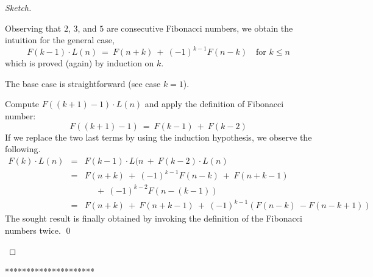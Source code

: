 {\begin{proof}[Sketch]
\begin{itemize}
Observing that $2$, $3$, and $5$ are consecutive Fibonacci numbers, we obtain the intuition for the general case,
\[  F(k-1) \cdot L(n) \ = \ F(n+k) \ + \ (-1)^{k-1}F(n-k) \ \ \ \mbox{ for  } k \leq n \]
which is proved (again) by induction on $k$.

\smallskip

The base case is straightforward (see case $k=1$).

\smallskip

Compute $F((k+1)-1) \cdot L(n)$ and apply the definition of Fibonacci number:
\[ F((k+1)-1) \ = \ F(k-1) \ + \ F(k-2) \]
If we replace the two last terms by using the induction hypothesis, we observe the following.
\begin{eqnarray*}
F(k) \cdot L(n) & = & F(k-1) \cdot L(n \ + \ F(k-2) \cdot L(n) \\
                        & = & F(n+k) \ + \ (-1)^{k-1} F(n-k) \ + \ F(n+k-1) \\
                        &    & \ \ \ \ \ \ + \ (-1)^{k-2} F(n-(k-1)) \\
                        & = & F(n+k) \ + \ F(n+k-1) \ + \ (-1)^{k-1} (F(n-k) \ -  F(n-k+1))
\end{eqnarray*}
The sought result is finally obtained by invoking the definition of the Fibonacci numbers twice. \qed
\end{itemize}
\end{proof}
*********************}
